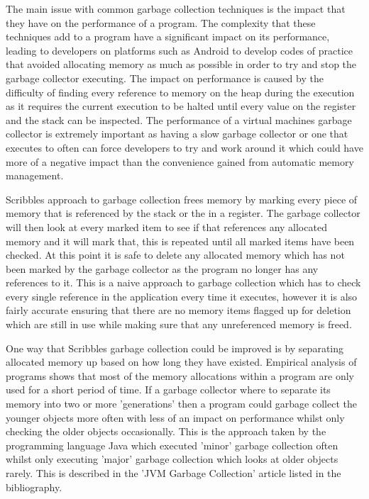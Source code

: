 \documentclass[]{final_report}
\begin{document}
The main issue with common garbage collection techniques is the impact that they have on the performance of a program. The complexity that these techniques add to a program have a significant impact on its performance, leading to developers on platforms such as Android to develop codes of practice that avoided allocating memory as much as possible in order to try and stop the garbage collector executing. The impact on performance is caused by the difficulty of finding every reference to memory on the heap during the execution as it requires the current execution to be halted until every value on the register and the stack can be inspected. The performance of a virtual machines garbage collector is extremely important as having a slow garbage collector or one that executes to often can force developers to try and work around it which could have more of a negative impact than the convenience gained from automatic memory management.

Scribbles approach to garbage collection frees memory by marking every piece of memory that is referenced by the stack or the in a register. The garbage collector will then look at every marked item to see if that references any allocated memory and it will mark that, this is repeated until all marked items have been checked. At this point it is safe to delete any allocated memory which has not been marked by the garbage collector as the program no longer has any references to it. This is a naive approach to garbage collection which has to check every single reference in the application every time it executes, however it is also fairly accurate ensuring that there are no memory items flagged up for deletion which are still in use while making sure that any unreferenced memory is freed.

One way that Scribbles garbage collection could be improved is by separating allocated memory up based on how long they have existed. Empirical analysis of programs shows that most of the memory allocations within a program are only used for a short period of time. If a garbage collector where to separate its memory into two or more 'generations' then a program could garbage collect the younger objects more often with less of an impact on performance whilst only checking the older objects occasionally. This is the approach taken by the programming language Java which executed 'minor' garbage collection often whilst only executing 'major' garbage collection which looks at older objects rarely. This is described in the 'JVM Garbage Collection' article listed in the bibliography.
\end{document}
